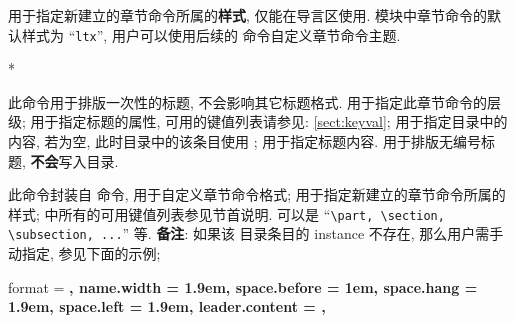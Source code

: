 \clearpage
\begin{function}[added=2025-09-10]{\zsectitlestyle}
  \begin{syntax}
  \end{syntax}
   用于指定新建立的章节命令所属的\textbf{样式}, 
  仅能在导言区使用.  模块中章节命令的默认样式为 ``\texttt{ltx}'',
  用户可以使用后续的 \cmd{\zsecdefine} 命令自定义章节命令主题.
\end{function}


\begin{function}[added=2025-09-08]{\zsectitleOnce}
  \begin{syntax}
  *
  \end{syntax}
  此命令用于排版一次性的标题, 不会影响其它标题格式.  用于指定此章节命令的层级;
   用于指定标题的属性, 可用的键值列表请参见: \cref{sect:keyval};  
  用于指定目录中的内容, 若为空, 此时目录中的该条目使用 ;  
  用于指定标题内容. \cmd{\zsectitleOnce*} 用于排版无编号标题, \textbf{不会}写入目录.
\end{function}



\begin{function}[added=2025-08-29]{\zsecdefine}
  \begin{syntax}
  \end{syntax}
  此命令封装自  命令, 用于自定义章节命令格式; 
   用于指定新建立的章节命令所属的样式;  中所有的可用键值列表参见节首说明. 
   可以是 ``\verb|\part, \section, \subsection, ...|'' 等. 
  \textbf{备注}: 如果该  目录条目的 instance 不存在, 那么用户需手动指定, 参见下面的示例;\par
\end{function}
\begin{DocExample}[++]
  {
    format         = \large\bfseries\color{red},
    name.width     = 1.9em,
    space.before   = 1em\@plus\p@,
    space.hang     = 1.9em,
    space.left     = 1.9em,
    leader.content = ,
  }
\end{DocExample}



